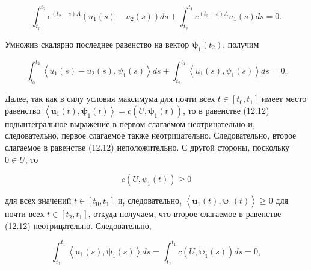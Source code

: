 \documentclass[8pt]{extarticle}
\begin{document}
\[
{\int }_{{t}_{0}}^{{t}_{2}}{e}^{\left( {{t}_{2} - s}\right) A}\left( {{u}_{1}\left( s\right)  - {u}_{2}\left( s\right) }\right) {ds} + {\int }_{{t}_{2}}^{{t}_{1}}{e}^{\left( {{t}_{2} - s}\right) A}{u}_{1}\left( s\right) {ds} = 0.
\]

Умножив скалярно последнее равенство на вектор \({\mathbf{\psi }}_{1}\left( {t}_{2}\right)\), получим

\[
{\int }_{{t}_{0}}^{{t}_{2}}\left\langle  {{u}_{1}\left( s\right)  - {u}_{2}\left( s\right) ,{\psi }_{1}\left( s\right) }\right\rangle  {ds} + {\int }_{{t}_{2}}^{{t}_{1}}\left\langle  {{u}_{1}\left( s\right) ,{\psi }_{1}\left( s\right) }\right\rangle  {ds} = 0. \tag{12.12}
\]

Далее, так как в силу условия максимума для почти всех \(t \in  \left\lbrack  {{t}_{0},{t}_{1}}\right\rbrack\) имеет место равенство \(\left\langle  {{\mathbf{u}}_{1}\left( t\right) ,{\mathbf{\psi }}_{1}\left( t\right) }\right\rangle   = c\left( {U,{\mathbf{\psi }}_{1}\left( t\right) }\right)\), то в равенстве (12.12) подынтегральное выражение в первом слагаемом неотрицательно и, следовательно, первое слагаемое также неотрицательно. Следовательно, второе слагаемое в равенстве (12.12) неположительно. С другой стороны, поскольку \(0 \in  U\), то

\[
c\left( {U,{\psi }_{1}\left( t\right) }\right)  \geq  0
\]

для всех значений \(t \in  \left\lbrack  {{t}_{0},{t}_{1}}\right\rbrack\) и, следовательно, \(\left\langle  {{\mathbf{u}}_{1}\left( t\right) ,{\mathbf{\psi }}_{1}\left( t\right) }\right\rangle   \geq  0\) для почти всех \(t \in  \left\lbrack  {{t}_{2},{t}_{1}}\right\rbrack\), откуда получаем, что второе слагаемое в равенстве (12.12) неотрицательно. Следовательно,

\[
{\int }_{{t}_{2}}^{{t}_{1}}\left\langle  {{\mathbf{u}}_{1}\left( s\right) ,{\mathbf{\psi }}_{1}\left( s\right) }\right\rangle  {ds} = {\int }_{{t}_{2}}^{{t}_{1}}c\left( {U,{\mathbf{\psi }}_{1}\left( s\right) }\right) {ds} = 0,
\]
\end{document}
